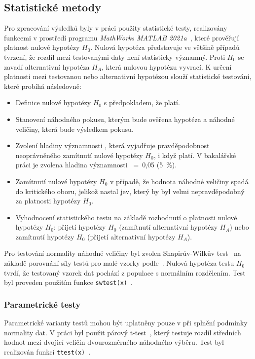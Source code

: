 \subsection{Statistické metody}
\label{section:statistical_methods}
Pro zpracování výsledků byly v práci použity statistické testy, realizovány
funkcemi v prostředí programu \textit{MathWorks MATLAB 2021a}~\cite{MATLAB},
které prověřují platnost nulové hypotézy $H_0$. Nulová hypotéza představuje ve
většině případů tvrzení, že rozdíl mezi testovanými daty není statisticky
významný. Proti $H_0$ se zavadí alternativní hypotéza $H_A$, která nulovou
hypotézu vyvrací. K určení platnosti mezi testovanou nebo alternativní hypotézou
slouží statistické testování, které probíhá následovně:
\begin{itemize}
    \item Definice nulové hypotézy $H_0$ s předpokladem, že platí.
    \item Stanovení náhodného pokusu, kterým bude ověřena hypotéza a náhodné
          veličiny, která bude výsledkem pokusu.
    \item Zvolení hladiny významnosti \textalpha, která vyjadřuje
          pravděpodobnost neoprávněného zamítnutí nulové hypotézy $H_0$, i když platí.
          V bakalářské práci je zvolena hladina významnosti \textalpha~=~0,05 (5~\%).
    \item Zamítnutí nulové hypotézy $H_0$ v případě, že hodnota náhodné veličiny
          spadá do kritického oboru, jelikož nastal jev, který by byl velmi
          nepravděpodobný za platnosti hypotézy $H_0$.
    \item Vyhodnocení statistického testu na základě rozhodnutí o platnosti
          nulové hypotézy $H_0$: přijetí hypotézy $H_0$ (zamítnutí alternativní
          hypotézy $H_A$) nebo zamítnutí hypotézy $H_0$ (přijetí alternativní
          hypotézy $H_A$).
\end{itemize}

Pro testování normality náhodné veličiny byl zvolen Shapirův-Wilkův
test~\cite{wikiSHAPIROWILK} na základě porovnání síly testů pro malé vzorky
podle~\cite{Razali2011}. Nulová hypotéza testu $H_0$ tvrdí, že testovaný vzorek
dat pochází z populace s normálním rozdělením. Test byl proveden použitím funkce
\texttt{swtest(x)}~\cite{matlabSWTEST}.

\subsubsection{Parametrické testy}
\label{section:parametric_tests}
Parametrické varianty testů mohou být uplatněny pouze v při splnění podmínky
normality dat. V práci byl použit párový t-test~\cite{Henry2005}, který testuje
rozdíl středních hodnot mezi dvojicí veličin dvourozměrného náhodného výběru.
Test byl realizován funkcí \texttt{ttest(x)}~\cite{matlabTTEST}.